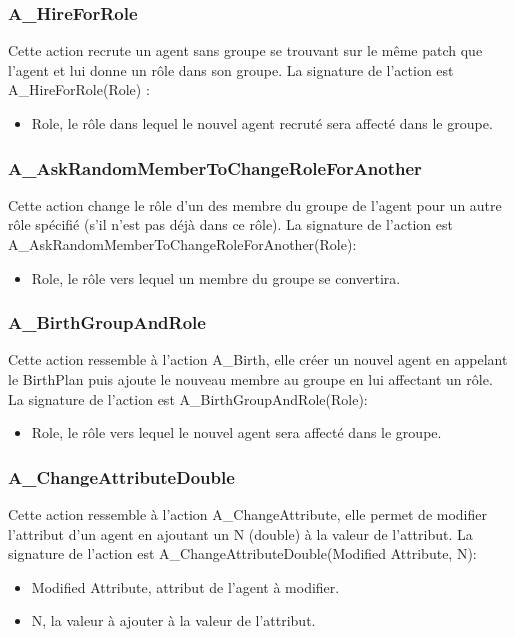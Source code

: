 \subsubsection{A\_HireForRole}

Cette action recrute un agent sans groupe se trouvant sur le même patch que l'agent et lui donne un rôle dans son groupe.
La signature de l'action est A\_HireForRole(Role) :
\begin{itemize}
\item Role, le rôle dans lequel le nouvel agent recruté sera affecté dans le groupe.
\end{itemize}

\subsubsection{A\_AskRandomMemberToChangeRoleForAnother}

Cette action change le rôle d'un des membre du groupe de l'agent pour un autre rôle spécifié (s'il n'est pas déjà dans ce rôle).
La signature de l'action est A\_AskRandomMemberToChangeRoleForAnother(Role):
\begin{itemize}
\item Role, le rôle vers lequel un membre du groupe se convertira.
\end{itemize}

\subsubsection{A\_BirthGroupAndRole}

Cette action ressemble à l'action A\_Birth, elle créer un nouvel agent en appelant le BirthPlan puis ajoute le nouveau membre au groupe en lui affectant un rôle.
La signature de l'action est A\_BirthGroupAndRole(Role):
\begin{itemize}
\item Role, le rôle vers lequel le nouvel agent sera affecté dans le groupe.
\end{itemize}

\subsubsection{A\_ChangeAttributeDouble}

Cette action ressemble à l'action A\_ChangeAttribute, elle permet de modifier l'attribut d'un agent en ajoutant un N (double) à la valeur de l'attribut.
La signature de l'action est A\_ChangeAttributeDouble(Modified Attribute, N):
\begin{itemize}
\item Modified Attribute, attribut de l'agent à modifier.
\item N, la valeur à ajouter à la valeur de l'attribut.
\end{itemize}

